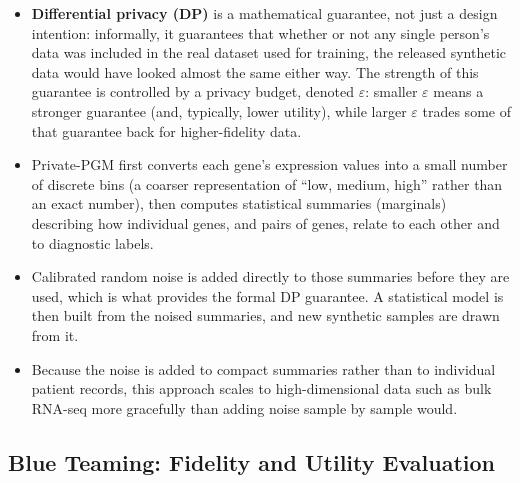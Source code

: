 \documentclass[webpdf,contemporary,large]{oup-authoring-template}%
\theoremstyle{thmstyleone}%
\theoremstyle{thmstyletwo}%
\theoremstyle{thmstylethree}%
\begin{document}
\begin{technicalbox}[title={How Private-PGM works, and what ``differential privacy'' means}]
  \begin{itemize}
    \item \textbf{Differential privacy (DP)} is a mathematical guarantee,
          not just a design intention: informally, it guarantees that
          whether or not any single person's data was included in the
          real dataset used for training, the released synthetic data
          would have looked almost the same either way. The strength of
          this guarantee is controlled by a privacy budget, denoted
          $\varepsilon$: smaller $\varepsilon$ means a stronger guarantee
          (and, typically, lower utility), while larger $\varepsilon$
          trades some of that guarantee back for higher-fidelity data.
    \item Private-PGM first converts each gene's expression values into a
          small number of discrete bins (a coarser representation of
          ``low, medium, high'' rather than an exact number), then
          computes statistical summaries (marginals) describing how
          individual genes, and pairs of genes, relate to each other and
          to diagnostic labels.
    \item Calibrated random noise is added directly to those summaries
          before they are used, which is what provides the formal DP
          guarantee. A statistical model is then built from the
          noised summaries, and new synthetic samples are drawn from it.
    \item Because the noise is added to compact summaries rather than to
          individual patient records, this approach scales to
          high-dimensional data such as bulk RNA-seq more gracefully than
          adding noise sample by sample would.
  \end{itemize}
\end{technicalbox}

\subsection{Blue Teaming: Fidelity and Utility Evaluation}
\end{document}
